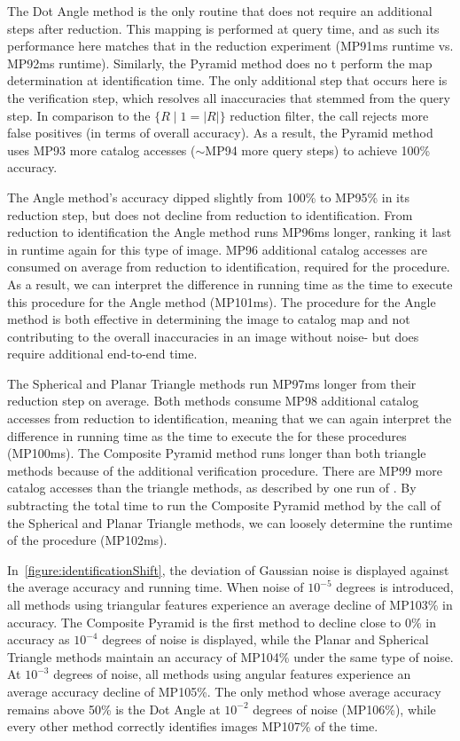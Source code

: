 The Dot Angle method is the only routine that does not require an additional steps after reduction.
This mapping is performed at query time, and as such its performance here matches that in the reduction experiment
(MP91ms runtime vs. MP92ms runtime).
Similarly, the Pyramid method does no t perform the map determination at identification time.
The only additional step that occurs here is the verification step, which resolves all inaccuracies that stemmed
from the query step.
In comparison to the $\{ R \mid 1 = |R|\}$ reduction filter, the  call rejects more false positives
(in terms of overall accuracy).
As a result, the Pyramid method uses MP93 more catalog accesses ($\sim$MP94 more query steps) to achieve 100\% accuracy.

The Angle method's accuracy dipped slightly from 100\% to MP95\% in its reduction step, but does not decline from
reduction to identification.
From reduction to identification the Angle method runs MP96ms longer, ranking it last in runtime again for this
type of image.
MP96 additional catalog accesses are consumed on average from reduction to identification, required for the
 procedure.
As a result, we can interpret the difference in running time as the time to execute this procedure for the Angle method
(MP101ms).
The  procedure for the Angle method is both effective in determining the image to catalog map and not
contributing to the overall inaccuracies in an image without noise- but does require additional end-to-end time.

The Spherical and Planar Triangle methods run MP97ms longer from their reduction step on average.
Both methods consume MP98 additional catalog accesses from reduction to identification, meaning that we can again
interpret the difference in running time as the time to execute the  for these procedures (MP100ms).
The Composite Pyramid method runs longer than both triangle methods because of the additional verification
procedure.
There are MP99 more catalog accesses than the triangle methods, as described by one run of .
By subtracting the total time to run the Composite Pyramid method by the  call of the Spherical and
Planar Triangle methods, we can loosely determine the runtime of the  procedure (MP102ms).

In~\autoref{figure:identificationShift}, the deviation of Gaussian noise is displayed against the average accuracy and
running time.
When noise of $10^{-5}$ degrees is introduced, all methods using triangular features experience an average decline of
MP103\% in accuracy.
The Composite Pyramid is the first method to decline close to 0\% in accuracy as $10^{-4}$ degrees of noise is
displayed, while the Planar and Spherical Triangle methods maintain an accuracy of MP104\% under the same type of noise.
At $10^{-3}$ degrees of noise, all methods using angular features experience an average accuracy decline of MP105\%.
The only method whose average accuracy remains above 50\% is the Dot Angle at $10^{-2}$ degrees of noise (MP106\%),
while every other method correctly identifies images MP107\% of the time.

